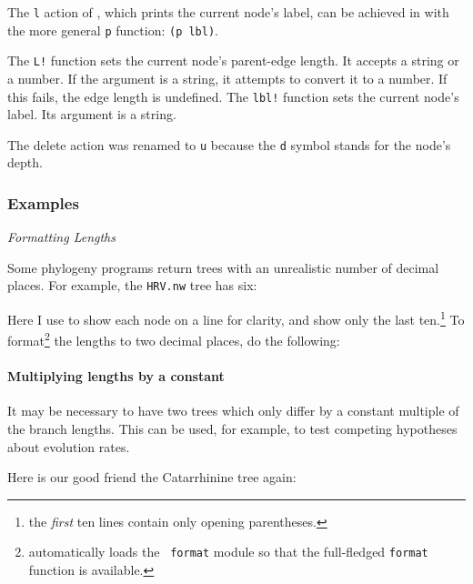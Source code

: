 \noindent{}The \texttt{l} action of \ed{}, which prints the current node's
label, can be achieved in \sched{} with the more general \texttt{p} function:
\texttt{(p lbl)}.

The \texttt{L!} function sets the current node's parent-edge length. It accepts
a string or a number. If the argument is a string, it attempts to convert it to
a number. If this fails, the edge length is undefined. The \texttt{lbl!}
function sets the current node's label. Its argument is a string.

The delete action was renamed to \texttt{u} because the \texttt{d} symbol stands
for the node's depth.

\subsubsection{Examples}

{\it Formatting Lengths} 

\noindent{}Some phylogeny programs return \nw{} trees with an unrealistic number
of decimal places. For example, the \texttt{HRV.nw} tree has six:


\begin{samepage}

\end{samepage}

\noindent{}Here I use \nwindent{} to show each node on a line for clarity, and
show only the last ten.\footnote{the \emph{first} ten lines contain only
opening parentheses.} To format\footnote{\sched{} automatically loads the {\tt
format} module so that the full-fledged {\tt format} function is available.}
the lengths to two decimal places, do the following:


\begin{samepage}

\end{samepage}

\begin{samepage}
\paragraph{Multiplying lengths by a constant}

It may be necessary to have two trees which only differ by a constant multiple
of the branch lengths. This can be used, for example, to test competing
hypotheses about evolution rates.
\end{samepage}
Here is our good friend the Catarrhinine tree again:

